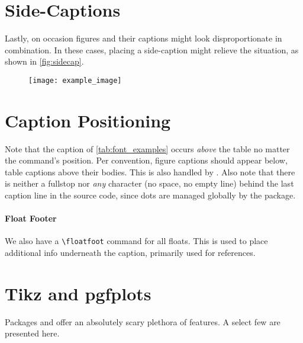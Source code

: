 \section{Side-Captions}
Lastly, on occasion figures and their captions might look disproportionate in combination.
In these cases, placing a side-caption might relieve the situation, as shown in \cref{fig:sidecap}.
\begin{figure}
%
{%
	\texttt{[image: example\_image]}%
}%
\end{figure}
\section{Caption Positioning}
Note that the caption of \cref{tab:font_examples} occurs \textit{above} the table no matter the  command's position.
Per convention, figure captions should appear below, table captions above their bodies.
This is also handled by .
Also note that there is neither a fullstop nor \textit{any} character (no space, no empty line) behind the last caption line in the source code, since dots are managed globally by the  package.
\paragraph{Float Footer}
We also have a \verb|\floatfoot| command for all floats.
This is used to place additional info underneath the caption, primarily used for references.
\section{Tikz and pgfplots}
Packages  and  offer an absolutely scary plethora of features.
A select few are presented here.

